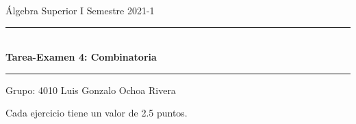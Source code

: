 \documentclass[letterpaper,11pt]{article}
\begin{document}
\setlength{\parindent}{0pt}

Álgebra Superior I \;\;\;\;\;\;\;\;\;\;\;\;\;\;\;\;\;\;\;\;\;\;\;\;\;\;\;\;\;\;\;\;\;\;\;\;\;\;\;\;\;\;\;\;\;\;\;\;\;\;\;\;\;\;\;\;\;\;\;\;\;\;\;\;\;\;\;\;\;\;\;\;\;\;\;\;\;\;\;\;\;\;\;\;\;\;\;\;\;\;\;\;\;\;\;\;\;\;
Semestre 2021-1

  \rule{16.6cm}{0.3pt} %
  \begin{center}
    \LARGE \textbf{\\Tarea-Examen 4: Combinatoria}
  \end{center}
  \rule{16.6cm}{0.3pt} \newline

  Grupo: 4010 \newline
  Luis Gonzalo Ochoa Rivera \newline \newline

  Cada ejercicio tiene un valor de 2.5 puntos. \newline
\end{document}
